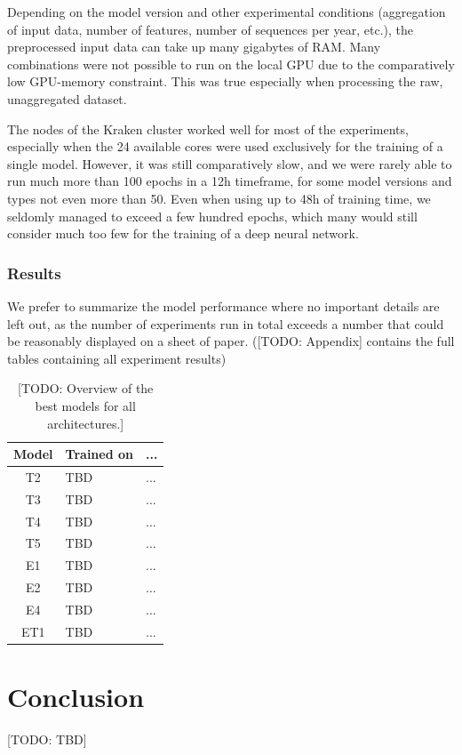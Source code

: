 Depending on the model version and other experimental conditions (aggregation of input data, number of features, number of sequences per year, etc.), the preprocessed input data can take up many gigabytes of RAM. Many combinations were not possible to run on the local GPU due to the comparatively low GPU-memory constraint. This was true especially when processing the raw, unaggregated dataset.

The nodes of the Kraken cluster worked well for most of the experiments, especially when the 24 available cores were used exclusively for the training of a single model. However, it was still comparatively slow, and we were rarely able to run much more than 100 epochs in a 12h timeframe, for some model versions and types not even more than 50. Even when using up to 48h of training time, we seldomly managed to exceed a few hundred epochs, which many would still consider much too few for the training of a deep neural network.

\subsubsection{Results}
\label{ssst:experimental_results}
We prefer to summarize the model performance where no important details are left out, as the number of experiments run in total exceeds a number that could be reasonably displayed on a sheet of paper. ([TODO: Appendix] contains the full tables containing all experiment results)

\begin{landscape}
  \begin{table}[h]
    \begin{tabularx}{\linewidth}{|c|X|X|}
      \hline
      Model & Trained on & ... \\
      \hline
      T2 & TBD & ... \\
      T3 & TBD & ... \\
      T4 & TBD & ... \\
      T5 & TBD & ... \\
      E1 & TBD & ... \\
      E2 & TBD & ... \\
      E4 & TBD & ... \\
      ET1 & TBD & ... \\
      \hline
    \end{tabularx}
    \caption{[TODO: Overview of the best models for all architectures.]}
    \label{tab:experimental_results}
  \end{table}
\end{landscape}

\clearpage
\section{Conclusion}
[TODO: TBD]

